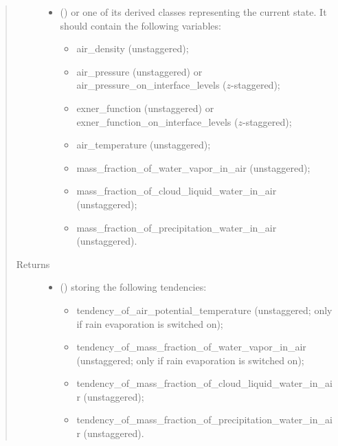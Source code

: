 \documentclass[letterpaper,10pt,english]{sphinxmanual}
\begin{document}
\begin{fulllineitems}
\begin{fulllineitems}
\begin{quote}
\begin{description}
\begin{itemize}
\item {} 
 () \textendash{} 
 or one of its derived classes representing the current state.
It should contain the following variables:
\begin{itemize}
\item {} 
air\_density (unstaggered);

\item {} 
air\_pressure (unstaggered) or air\_pressure\_on\_interface\_levels (\(z\)-staggered);

\item {} 
exner\_function (unstaggered) or exner\_function\_on\_interface\_levels (\(z\)-staggered);

\item {} 
air\_temperature (unstaggered);

\item {} 
mass\_fraction\_of\_water\_vapor\_in\_air (unstaggered);

\item {} 
mass\_fraction\_of\_cloud\_liquid\_water\_in\_air (unstaggered);

\item {} 
mass\_fraction\_of\_precipitation\_water\_in\_air (unstaggered).

\end{itemize}


\end{itemize}

\item[{Returns}] \leavevmode
\begin{itemize}
\item {} 
 () \textendash{}  storing the following tendencies:
\begin{itemize}
\item {} 
tendency\_of\_air\_potential\_temperature (unstaggered; only if rain evaporation is switched on);

\item {} 
tendency\_of\_mass\_fraction\_of\_water\_vapor\_in\_air (unstaggered; only if rain evaporation is switched on);

\item {} 
tendency\_of\_mass\_fraction\_of\_cloud\_liquid\_water\_in\_air (unstaggered);

\item {} 
tendency\_of\_mass\_fraction\_of\_precipitation\_water\_in\_air (unstaggered).


\end{itemize}
\end{itemize}
\end{description}
\end{quote}
\end{fulllineitems}
\end{fulllineitems}
\end{document}
